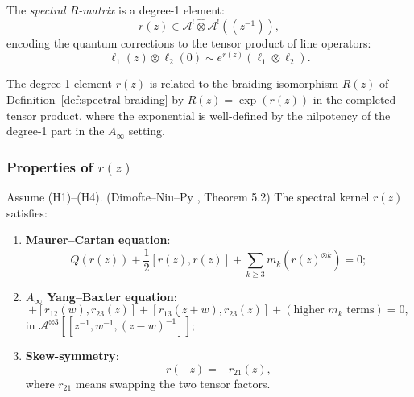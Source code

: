 \begin{definition}
The \emph{spectral $R$-matrix} is a degree-1 element:
\begin{equation}
r(z) \in \mathcal{A}^! \widehat{\otimes} \mathcal{A}^!((z^{-1})),
\end{equation}
encoding the quantum corrections to the tensor product of line operators:
\begin{equation}
\ell_1(z) \otimes \ell_2(0) \sim e^{r(z)} (\ell_1 \otimes \ell_2).
\end{equation}
\end{definition}

\begin{remark}
The degree-1 element $r(z)$ is related to the braiding isomorphism $R(z)$ of Definition~\ref{def:spectral-braiding} by $R(z) = \exp(r(z))$ in the completed tensor product, where the exponential is well-defined by the nilpotency of the degree-1 part in the $A_\infty$ setting.
\end{remark}

\subsubsection{Properties of $r(z)$}

\begin{theorem}
Assume \textrm{(H1)--(H4)}.
(Dimofte--Niu--Py \cite{DNP25}, Theorem 5.2) The spectral kernel $r(z)$ satisfies:
\begin{enumerate}[label=(\roman*)]
\item \textbf{Maurer--Cartan equation}:
\begin{equation}
Q(r(z)) + \frac{1}{2}[r(z), r(z)] + \sum_{k \geq 3} m_k(r(z)^{\otimes k}) = 0;
\end{equation}

\item \textbf{$A_\infty$ Yang--Baxter equation}:
\begin{equation}
[r_{12}(w), r_{13}(z+w)] + [r_{12}(w), r_{23}(z)] + [r_{13}(z+w), r_{23}(z)] + (\text{higher $m_k$ terms}) = 0,
\end{equation}
in $\mathcal{A}^{\otimes 3}[[z^{-1}, w^{-1}, (z-w)^{-1}]]$;

\item \textbf{Skew-symmetry}:
\begin{equation}
r(-z) = -r_{21}(z),
\end{equation}
where $r_{21}$ means swapping the two tensor factors.
\end{enumerate}
\end{theorem}

